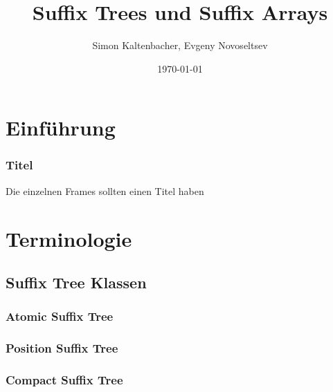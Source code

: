 \documentclass{beamer}
\title{Suffix Trees und Suffix Arrays}
\author{Simon Kaltenbacher, Evgeny Novoseltsev}
\date{\today}
\begin{document}

\frame{\titlepage}




\section{Einführung}
\begin{frame}
\frametitle{Titel}
Die einzelnen Frames sollten einen Titel haben
\end{frame}


\section{Terminologie}


\subsection{Suffix Tree Klassen}

\begin{frame}
\frametitle{Atomic Suffix Tree}
\end{frame}

\begin{frame}
\frametitle{Position Suffix Tree}
\end{frame}

\begin{frame}
\frametitle{Compact Suffix Tree}
\end{frame}
\end{document}
